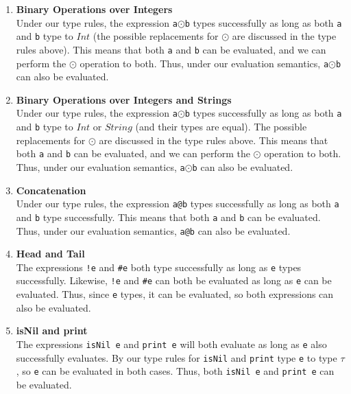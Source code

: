 \documentclass[12pt]{article}
\begin{document}
\begin{enumerate}
\item \textbf{Binary Operations over Integers}\\
Under our type rules, the expression \texttt{a$\odot$b} types successfully as long as both \texttt{a} and \texttt{b} type to $Int$ (the possible replacements for $\odot$ are discussed in the type rules above). This means that both \texttt{a} and \texttt{b} can be evaluated, and we can perform the $\odot$ operation to both. Thus, under our evaluation semantics, \texttt{a$\odot$b} can also be evaluated.

\item \textbf{Binary Operations over Integers and Strings}\\
Under our type rules, the expression \texttt{a$\odot$b} types successfully as long as both \texttt{a} and \texttt{b} type to $Int$ or $String$ (and their types are equal). The possible replacements for $\odot$ are discussed in the type rules above. This means that both \texttt{a} and \texttt{b} can be evaluated, and we can perform the $\odot$ operation to both. Thus, under our evaluation semantics, \texttt{a$\odot$b} can also be evaluated.

\item \textbf{Concatenation}\\
Under our type rules, the expression \texttt{a@b} types successfully as long as both \texttt{a} and \texttt{b} type successfully. This means that both \texttt{a} and \texttt{b} can be evaluated. Thus, under our evaluation semantics, \texttt{a@b} can also be evaluated.

\item \textbf{Head and Tail}\\
The expressions \texttt{!e} and \texttt{\#e} both type successfully as long as \texttt{e} types successfully. Likewise, \texttt{!e} and \texttt{\#e} can both be evaluated as long as \texttt{e} can be evaluated. Thus, since \texttt{e} types, it can be evaluated, so both expressions can also be evaluated.

\item \textbf{isNil and print}\\
The expressions \texttt{isNil e} and \texttt{print e} will both evaluate as long as \texttt{e} also successfully evaluates. By our type rules for \texttt{isNil} and \texttt{print} type \texttt{e} to type $\tau$, so \texttt{e} can be evaluated in both cases. Thus, both \texttt{isNil e} and \texttt{print e} can be evaluated.

\end{enumerate}
\end{document}
